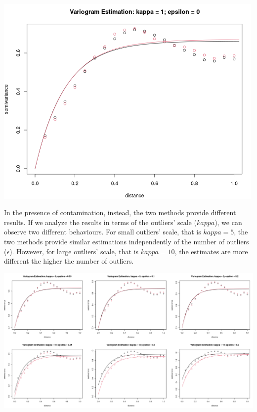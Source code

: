 \documentclass[
  12pt]{article}
\begin{document}
\begin{center}
\includegraphics[width=5.20833in,height=\textheight]{img/variog_grf_ols.png}
\end{center}

In the presence of contamination, instead, the two methods provide
different results. If we analyze the results in terms of the outliers'
scale (\(kappa\)), we can observe two different behaviours. For small
outliers' scale, that is \(kappa = 5\), the two methods provide similar
estimations independently of the number of outliers (\(\epsilon\)).
However, for large outliers' scale, that is \(kappa = 10\), the
estimates are more different the higher the number of outliers.

\begin{center}
\includegraphics[width=6.25in,height=\textheight]{img/variog_cgrf_ols.png}
\end{center}
\end{document}
